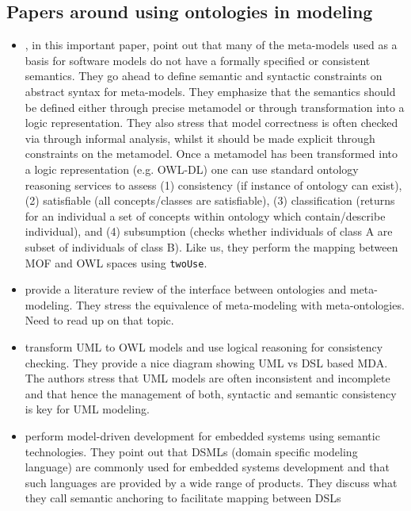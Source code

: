 
\subsection{Papers around using ontologies in modeling}  

  \begin{itemize}
   \item \cite{staab_model_2010}, in this important paper, point out that many of the meta-models used as a basis for software models do not have a formally specified or consistent semantics. They go ahead to define semantic and syntactic constraints on abstract syntax for meta-models. They emphasize that the semantics should be defined either through precise metamodel or through transformation into a logic representation. They also stress that model correctness is often checked via through informal analysis, whilst it should be made explicit through constraints on the metamodel. Once a metamodel has been transformed into a logic representation (e.g. OWL-DL) one can use standard ontology reasoning services to assess (1) consistency (if instance of ontology can exist), (2) satisfiable (all concepts/classes are satisfiable), (3)  classification (returns for an individual a set of concepts within ontology which contain/describe individual), and (4) subsumption (checks whether individuals of class A are subset of individuals of class B). Like us, they perform the mapping between MOF and OWL spaces using \verb+twoUse+.
   \item \cite{henderson-sellers_bridging_2011} provide a literature review of the interface between ontologies and meta-modeling. They stress the equivalence of meta-modeling with meta-ontologies. Need to read up on that topic.
   \item \cite{wang_ontology_2006} transform UML to OWL models and use logical reasoning for consistency checking. They provide a nice diagram showing UML vs DSL based MDA. The authors stress that UML models are often inconsistent and incomplete and that hence the management of both, syntactic and semantic consistency is key for UML modeling.
   \item \cite{hemingway_semantic_2007} perform model-driven development for embedded systems using semantic technologies. They point out that  DSMLs (domain specific modeling language)  are commonly used for embedded systems development and that such languages are provided by a wide range of products. They discuss what they call semantic anchoring to facilitate mapping between DSLs
  \end{itemize}
